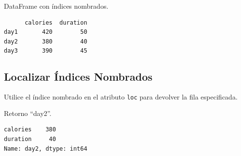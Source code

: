 \begin{code} DataFrame con índices nombrados.

\begin{Shaded}
\begin{Highlighting}[]

\OperatorTok{=}\NormalTok{ \{}
  \NormalTok{: [}\NormalTok{, }\NormalTok{, }\NormalTok{],}
  \NormalTok{: [}\NormalTok{, }\NormalTok{, }\NormalTok{]}
\NormalTok{\}}

\OperatorTok{=}\OperatorTok{=}\NormalTok{ [}\NormalTok{, }\NormalTok{, }\NormalTok{])}

\end{Highlighting}
\end{Shaded}

\begin{verbatim}
      calories  duration
day1       420        50
day2       380        40
day3       390        45
\end{verbatim}
\end{code}

\subsection{Localizar Índices Nombrados}

Utilice el índice nombrado en el atributo \texttt{loc} para devolver la fila especificada.\\

\begin{code} Retorno ``day2''.

\begin{Shaded}
\begin{Highlighting}[]
\NormalTok{(df.loc[}\NormalTok{])}
\end{Highlighting}
\end{Shaded}

\begin{verbatim}
calories    380
duration     40
Name: day2, dtype: int64
\end{verbatim}
\end{code}

